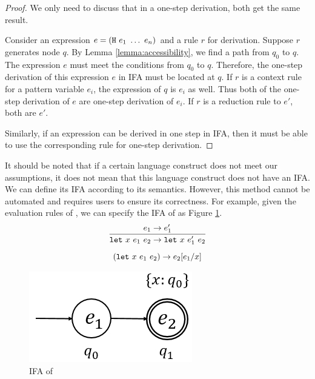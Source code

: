 \begin{proof}
    We only need to discuss that in a one-step derivation, both get the same result.

    Consider an expression $e=(\mbox{\tt H}~e_1~\ldots~e_n)$ and a rule $r$ for derivation. Suppose $r$ generates node $q$. By Lemma \ref{lemma:accessibility}, we find a path from $q_0$ to $q$. The expression $e$ must meet the conditions from $q_0$ to $q$. Therefore, the one-step derivation of this expression $e$ in IFA must be located at $q$. If $r$ is a context rule for a pattern variable $e_i$, the expression of $q$ is $e_i$ as well. Thus both of the one-step derivation of $e$ are one-step derivation of $e_i$. If $r$ is a reduction rule to $e'$, both are $e'$.

    Similarly, if an expression can be derived in one step in IFA, then it must be able to use the corresponding rule for one-step derivation.
\end{proof}


It should be noted that if a certain language construct does not meet our assumptions, it does not mean that this language construct does not have an IFA. We can define its IFA according to its semantics. However, this method cannot be automated and requires users to ensure its correctness. For example, given the evaluation rules of , we can specify the IFA of  as Figure \ref{fig:ifa-let}.
\[
    \infer{\m{let}~x~e_1~e_2 \to \m{let}~x~e_1'~e_2}{e_1 \to e_1'}
\]\[
    (\mbox{\tt let}~x~e_1~e_2) \to e_2[e_1/x]
\]


\begin{figure}[t]
    \centering
    \includegraphics[scale=0.25]{images/ifa/ifa-let.png}
    \caption{IFA of }
    \label{fig:ifa-let}
\end{figure}

